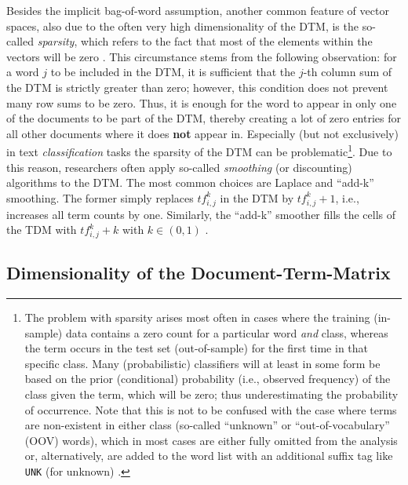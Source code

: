 Besides the implicit bag-of-word assumption, another common feature of vector spaces, also due to the often very high dimensionality of the DTM, is the so-called \emph{sparsity}, which refers to the fact that most of the elements within the vectors will be zero \parencite[252]{Jurafsky_Draft_2017}. This circumstance stems from the following observation: for a word $j$ to be included in the DTM, it is sufficient that the $j$-th column sum of the DTM is strictly greater than zero; however, this condition does not prevent many row sums to be zero. Thus, it is enough for the word to appear in only one of the documents to be part of the DTM, thereby creating a lot of zero entries for all other documents where it does \textbf{not} appear in. Especially (but not exclusively) in text \textit{classification} tasks the sparsity of the DTM can be problematic\footnote{The problem with sparsity arises most often in cases where the training (in-sample) data contains a zero count for a particular word \textit{and} class, whereas the term occurs in the test set (out-of-sample) for the first time in that specific class. Many (probabilistic) classifiers will at least in some form be based on the prior (conditional) probability (i.e., observed frequency) of the class given the term, which will be zero; thus underestimating the probability of occurrence. Note that this is not to be confused with the case where terms are non-existent in either class (so-called \enquote{unknown} or \enquote{out-of-vocabulary} (OOV) words), which in most cases are either fully omitted from the analysis or, alternatively, are added to the word list with an additional suffix tag like \texttt{UNK} (for unknown) \parencite[46, 79]{Jurafsky_Draft_2017}.}. Due to this reason, researchers often apply so-called \emph{smoothing} (or discounting) algorithms to the DTM. The most common choices are Laplace and \enquote{add-k} smoothing. The former simply replaces $tf_{i,j}^{k}$ in the DTM by $tf_{i,j}^{k} + 1$, i.e., increases all term counts by one. Similarly, the \enquote{add-k} smoother fills the cells of the TDM with $tf_{i,j}^{k} + k$ with $k \in (0,1)$ \parencite[47\psqq]{Jurafsky_Draft_2017}.



\subsection{Dimensionality of the Document-Term-Matrix}
\label{ssec: DTM_dimensionality}


